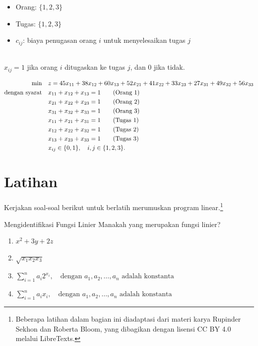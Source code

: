 \begin{solution}

\smallskip {}
\begin{itemize}
\item Orang: $\{1, 2, 3\}$
\item Tugas: $\{1, 2, 3\}$
\end{itemize}

\smallskip {}
\begin{itemize}
\item $c_{ij}$: biaya penugasan orang $i$ untuk menyelesaikan tugas $j$
\end{itemize}

\smallskip {} \\
$x_{ij} = 1$ jika orang $i$ ditugaskan ke tugas $j$, dan $0$ jika tidak.

\smallskip {}
\begin{align*}
\min \quad & z = 45x_{11} + 38x_{12} + 60x_{13} + 52x_{21} + 41x_{22} + 33x_{23} + 27x_{31} + 49x_{32} + 56x_{33} \\
\mbox{dengan syarat}\quad        & x_{11} + x_{12} + x_{13} = 1   \tag{Orang 1} \\
& x_{21} + x_{22} + x_{23} = 1   \tag{Orang 2} \\
& x_{31} + x_{32} + x_{33} = 1   \tag{Orang 3} \\
& x_{11} + x_{21} + x_{31} = 1   \tag{Tugas 1} \\
& x_{12} + x_{22} + x_{32} = 1   \tag{Tugas 2} \\
& x_{13} + x_{23} + x_{33} = 1   \tag{Tugas 3} \\
& x_{ij} \in \{0, 1\}, \quad i,j \in \{1,2,3\}.
\end{align*}
\end{solution}

\section{Latihan}

Kerjakan soal-soal berikut untuk berlatih merumuskan program linear.\footnote{Beberapa latihan dalam bagian ini diadaptasi dari materi karya Rupinder Sekhon dan Roberta Bloom, yang dibagikan dengan lisensi CC BY 4.0 melalui LibreTexts.}


\begin{ex}{Mengidentifikasi Fungsi Linier}{}
 Manakah yang merupakan fungsi linier?
\begin{enumerate}
    \item $x^2 + 3y + 2z$
    \item $\sqrt{x_1 x_2 x_3}$
    \item $\sum_{i=1}^n a_i 2^{x_i}, \quad \text{dengan } a_1, a_2, \dots, a_n \text{ adalah konstanta}$
    \item $\sum_{i=1}^n a_i x_i, \quad \text{dengan } a_1, a_2, \dots, a_n \text{ adalah konstanta}$
\end{enumerate}
\end{ex}

